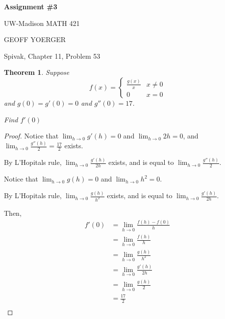 \documentclass{article} %
\theoremstyle{plain}
\newtheorem*{theorem*}{Theorem}
\theoremstyle{definition}
\begin{document}
\begin{center}
    \Large{
        \textbf{Assignment \#3}

        UW-Madison MATH 421
    }
    
    \vspace{5pt}
        
    \normalsize{
        GEOFF YOERGER

        \usdate
    }
    
    \vspace{15pt}
\end{center}

\noindent{} Spivak, Chapter 11, Problem 53
\begin{theorem*}
    Suppose
    $$
    f(x) = \begin{cases}
        \frac{g(x)}{x} & x \neq 0 \\
        0 & x = 0
    \end{cases}
    $$ 
    and $g(0) = g'(0) = 0$ and $g''(0) = 17$.

    Find $f'(0)$
\end{theorem*}
\begin{proof}
    Notice that $\lim_{h \to 0} g'(h) = 0$ and $\lim_{h \to 0} 2h = 0$, and $\lim_{h \to 0} \frac{g''(h)}{2} = \frac{17}{2}$ exists.

    By L'Hopitals rule, $\lim_{h \to 0} \frac{g'(h)}{2h}$ exists, and is equal to $\lim_{h \to 0} \frac{g''(h)}{2}$.

    Notice that $\lim_{h \to 0} g(h) = 0$ and $\lim_{h \to 0} h^2 = 0$.

    By L'Hopitals rule, $\lim_{h \to 0} \frac{g(h)}{h^2}$ exists, and is equal to $\lim_{h \to 0} \frac{g'(h)}{2h}$.

    Then,
    \begin{align*}
        f'(0) &= \lim_{h \to 0} \frac{f(h) - f(0)}{h} \\
        &= \lim_{h \to 0} \frac{f(h)}{h} \\
        &= \lim_{h \to 0} \frac{g(h)}{h^2} \\
        &= \lim_{h \to 0} \frac{g'(h)}{2h} \\
        &= \lim_{h \to 0} \frac{g(h)}{2} \\
        &= \frac{17}{2} \\
    \end{align*}

\end{proof}
\end{document}
